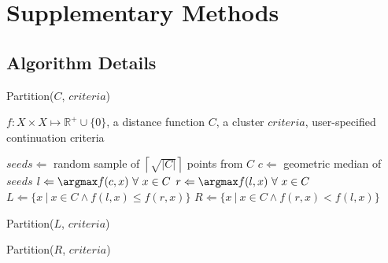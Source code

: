 \documentclass{article}
\begin{document}
\ifarxiv
\else
\ifpdf
{}
\fi
\fi

\maketitle


\section{Supplementary Methods}

\subsection{Algorithm Details}

\begin{algorithm} %
    \caption{Partition($C$, $criteria$)} %
    \label{alg:methods:partition} %
    \begin{algorithmic} %
    \Require $f: X \times X \mapsto \mathbb{R}^+ \cup \{0\}$, a distance function
    \Require $C$, a cluster
    \Require $criteria$, user-specified continuation criteria

    \State $seeds \Leftarrow$ random sample of $\left\lceil \sqrt{|C|} \right\rceil$ points from $C$
    \State $c \Leftarrow$ geometric median of $seeds$
    \State $l \Leftarrow \argmax f(c, x) \ \forall \ x \in C$
    \State $r \Leftarrow \argmax f(l, x) \ \forall \ x \in C$
    \State $L \Leftarrow \{x \ | \ x \in C \land f(l, x) \le f(r, x)\}$
    \State $R \Leftarrow \{x \ | \ x \in C \land f(r, x) < f(l, x)\}$

        \State Partition($L$, $criteria$)
    \EndIf

        \State Partition($R$, $criteria$)
    \EndIf
\end{algorithmic}
\end{algorithm}
\end{document}
